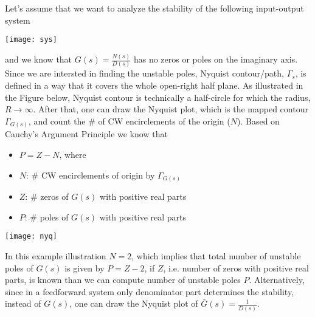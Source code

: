 \documentclass[twoside]{article}
\begin{document}
Let's assume that we want to analyze the stability of the following
input-output system

\vspace{6 pt}

  \begin{minipage}[h]{1\linewidth}
    \begin{center}
      \texttt{[image: sys]}
    \end{center}
  \end{minipage}

\vspace{6 pt}

and we know that $G(s) = \frac{N(s)}{D(s)}$ has no zeros or poles on
the imaginary axis. Since we are intersted in finding the unstable
poles, Nyquist contour/path, $\Gamma_s$, is defined in a way that it covers the
whole open-right half plane. As illustrated in the Figure below, 
Nyquist contour is technically a half-circle for which the radius, $R
\to \infty$. After that, one can draw the Nyquist plot, which is the
mapped contour $\Gamma_{G(s)}$, and count the $\#$ of CW encirclements 
of the origin ($N$). Based on Cauchy's Argument Principle we know that
%
\begin{itemize}
  \item $P = Z - N$, where
  \item $N$: $\#$ CW encirclements of origin by $\Gamma_{G(s)}$
  \item $Z$: $\#$ zeros of $G(s)$ with positive real parts
  \item $P$: $\#$ poles of $G(s)$ with positive real parts
\end{itemize}

\vspace{6 pt}

  \begin{minipage}[h]{1\linewidth}
    \begin{center}
      \texttt{[image: nyq]}
    \end{center}
  \end{minipage}

\vspace{6 pt}

In this example illustration $N = 2$, which implies that total number
of unstable poles of $G(s)$ is given by $P = Z - 2$, if $Z$,
i.e. number of zeros with positive real parts, is known than
we can compute number of unstable poles $P$. Alternatively, 
since in a feedforward system only denominator part determines
the stability, instead of $G(s)$, one can draw the Nyquist plot of 
$\bar{G}(s) = \frac{1}{D(s)}$.
\end{document}

